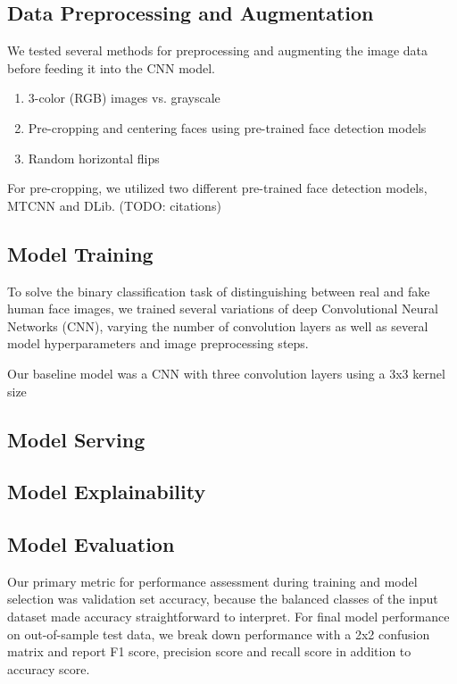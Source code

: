 \documentclass[11pt, letterpaper]{article}
\begin{document}
\begin{multicols}{2}
  \subsection{Data Preprocessing and Augmentation}

  We tested several methods for preprocessing and augmenting the image data before
  feeding it into the CNN model.

  \begin{enumerate}
  \item 3-color (RGB) images vs. grayscale
  \item Pre-cropping and centering faces using pre-trained face detection models
  \item Random horizontal flips
  \end{enumerate}

  For pre-cropping, we utilized two different pre-trained face detection models,
  MTCNN and DLib. (TODO: citations)

  \subsection{Model Training}

  To solve the binary classification task of distinguishing between real and fake
  human face images, we trained several variations of deep Convolutional
  Neural Networks (CNN), varying the number of convolution layers as well as several
  model hyperparameters and image preprocessing steps.

  Our baseline model was a CNN with three convolution layers using a 3x3 kernel size

  \subsection{Model Serving}

  \subsection{Model Explainability}

  \subsection{Model Evaluation}

  Our primary metric for performance assessment during training and model selection
  was validation set accuracy, because the balanced classes of the input dataset made
  accuracy straightforward to interpret. For final model performance on out-of-sample
  test data, we break down performance with a 2x2 confusion matrix and report F1 score,
  precision score and recall score in addition to accuracy score.


\end{multicols}
\end{document}
